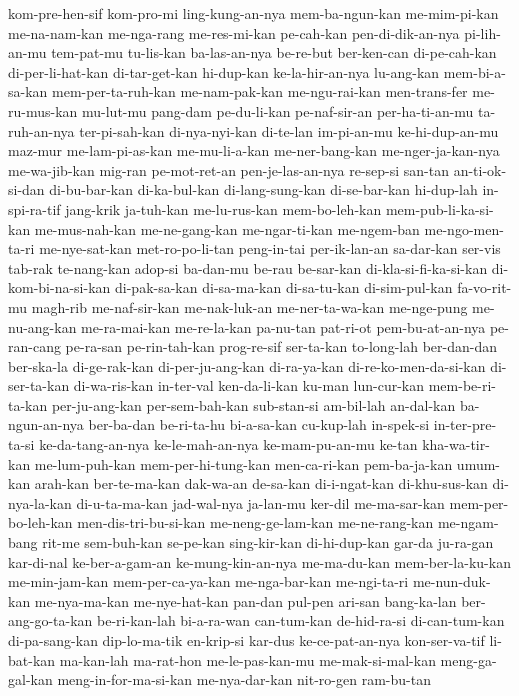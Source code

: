 {kom-pre-hen-sif kom-pro-mi ling-kung-an-nya mem-ba-ngun-kan me-mim-pi-kan me-na-nam-kan me-nga-rang me-res-mi-kan
pe-cah-kan pen-di-dik-an-nya pi-lih-an-mu tem-pat-mu tu-lis-kan ba-las-an-nya be-re-but ber-ken-can
di-pe-cah-kan di-per-li-hat-kan di-tar-get-kan hi-dup-kan ke-la-hir-an-nya lu-ang-kan mem-bi-a-sa-kan mem-per-ta-ruh-kan
me-nam-pak-kan me-ngu-rai-kan men-trans-fer me-ru-mus-kan mu-lut-mu pang-dam pe-du-li-kan pe-naf-sir-an
per-ha-ti-an-mu ta-ruh-an-nya ter-pi-sah-kan di-nya-nyi-kan di-te-lan im-pi-an-mu ke-hi-dup-an-mu maz-mur
me-lam-pi-as-kan me-mu-li-a-kan me-ner-bang-kan me-nger-ja-kan-nya me-wa-jib-kan mig-ran pe-mot-ret-an pen-je-las-an-nya
re-sep-si san-tan an-ti-ok-si-dan di-bu-bar-kan di-ka-bul-kan di-lang-sung-kan di-se-bar-kan hi-dup-lah
in-spi-ra-tif jang-krik ja-tuh-kan me-lu-rus-kan mem-bo-leh-kan mem-pub-li-ka-si-kan me-mus-nah-kan me-ne-gang-kan
me-ngar-ti-kan me-ngem-ban me-ngo-men-ta-ri me-nye-sat-kan met-ro-po-li-tan peng-in-tai per-ik-lan-an sa-dar-kan
ser-vis tab-rak te-nang-kan adop-si ba-dan-mu be-rau be-sar-kan di-kla-si-fi-ka-si-kan
di-kom-bi-na-si-kan di-pak-sa-kan di-sa-ma-kan di-sa-tu-kan di-sim-pul-kan fa-vo-rit-mu magh-rib me-naf-sir-kan
me-nak-luk-an me-ner-ta-wa-kan me-nge-pung me-nu-ang-kan me-ra-mai-kan me-re-la-kan pa-nu-tan pat-ri-ot
pem-bu-at-an-nya pe-ran-cang pe-ra-san pe-rin-tah-kan prog-re-sif ser-ta-kan to-long-lah ber-dan-dan
ber-ska-la di-ge-rak-kan di-per-ju-ang-kan di-ra-ya-kan di-re-ko-men-da-si-kan di-ser-ta-kan di-wa-ris-kan in-ter-val
ken-da-li-kan ku-man lun-cur-kan mem-be-ri-ta-kan per-ju-ang-kan per-sem-bah-kan sub-stan-si am-bil-lah
an-dal-kan ba-ngun-an-nya ber-ba-dan be-ri-ta-hu bi-a-sa-kan cu-kup-lah in-spek-si in-ter-pre-ta-si
ke-da-tang-an-nya ke-le-mah-an-nya ke-mam-pu-an-mu ke-tan kha-wa-tir-kan me-lum-puh-kan mem-per-hi-tung-kan men-ca-ri-kan
pem-ba-ja-kan umum-kan arah-kan ber-te-ma-kan dak-wa-an de-sa-kan di-i-ngat-kan di-khu-sus-kan
di-nya-la-kan di-u-ta-ma-kan jad-wal-nya ja-lan-mu ker-dil me-ma-sar-kan mem-per-bo-leh-kan men-dis-tri-bu-si-kan
me-neng-ge-lam-kan me-ne-rang-kan me-ngam-bang rit-me sem-buh-kan se-pe-kan sing-kir-kan di-hi-dup-kan
gar-da ju-ra-gan kar-di-nal ke-ber-a-gam-an ke-mung-kin-an-nya me-ma-du-kan mem-ber-la-ku-kan me-min-jam-kan
mem-per-ca-ya-kan me-nga-bar-kan me-ngi-ta-ri me-nun-duk-kan me-nya-ma-kan me-nye-hat-kan pan-dan pul-pen
ari-san bang-ka-lan ber-ang-go-ta-kan be-ri-kan-lah bi-a-ra-wan can-tum-kan de-hid-ra-si di-can-tum-kan
di-pa-sang-kan dip-lo-ma-tik en-krip-si kar-dus ke-ce-pat-an-nya kon-ser-va-tif li-bat-kan ma-kan-lah
ma-rat-hon me-le-pas-kan-mu me-mak-si-mal-kan meng-ga-gal-kan meng-in-for-ma-si-kan me-nya-dar-kan nit-ro-gen ram-bu-tan
}
